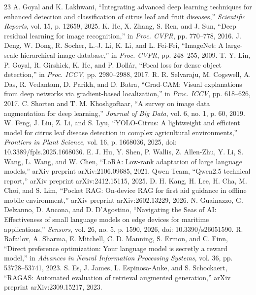 \documentclass[10pt,twocolumn,a4paper]{article}
\begin{document}
{\begin{thebibliography}{23}
 A. Goyal and K. Lakhwani, “Integrating advanced deep learning techniques for enhanced detection and classification of citrus leaf and fruit diseases,” \textit{Scientific Reports}, vol. 15, p. 12659, 2025.
 K. He, X. Zhang, S. Ren, and J. Sun, “Deep residual learning for image recognition,” in \textit{Proc. CVPR}, pp. 770–778, 2016.
 J. Deng, W. Dong, R. Socher, L.-J. Li, K. Li, and L. Fei-Fei, “ImageNet: A large-scale hierarchical image database,” in \textit{Proc. CVPR}, pp. 248–255, 2009.
 T.-Y. Lin, P. Goyal, R. Girshick, K. He, and P. Dollár, “Focal loss for dense object detection,” in \textit{Proc. ICCV}, pp. 2980–2988, 2017.
 R. R. Selvaraju, M. Cogswell, A. Das, R. Vedantam, D. Parikh, and D. Batra, “Grad-CAM: Visual explanations from deep networks via gradient-based localization,” in \textit{Proc. ICCV}, pp. 618–626, 2017.
 C. Shorten and T. M. Khoshgoftaar, “A survey on image data augmentation for deep learning,” \textit{Journal of Big Data}, vol. 6, no. 1, p. 60, 2019.
 W. Feng, J. Liu, Z. Li, and S. Lyu, “YOLO-Citrus: A lightweight and efficient model for citrus leaf disease detection in complex agricultural environments,” \textit{Frontiers in Plant Science}, vol. 16, p. 1668036, 2025, doi: 10.3389/fpls.2025.1668036.
 E. J. Hu, Y. Shen, P. Wallis, Z. Allen-Zhu, Y. Li, S. Wang, L. Wang, and W. Chen, “LoRA: Low-rank adaptation of large language models,” arXiv preprint arXiv:2106.09685, 2021.
 Qwen Team, “Qwen2.5 technical report,” arXiv preprint arXiv:2412.15115, 2025.
 D. H. Kang, H. Lee, H. Cha, M. Choi, and S. Lim, “Pocket RAG: On-device RAG for first aid guidance in offline mobile environment,” arXiv preprint arXiv:2602.13229, 2026.
 N. Guainazzo, G. Delzanno, D. Ancona, and D. D’Agostino, “Navigating the Seas of AI: Effectiveness of small language models on edge devices for maritime applications,” \textit{Sensors}, vol. 26, no. 5, p. 1590, 2026, doi: 10.3390/s26051590.
 R. Rafailov, A. Sharma, E. Mitchell, C. D. Manning, S. Ermon, and C. Finn, “Direct preference optimization: Your language model is secretly a reward model,” in \textit{Advances in Neural Information Processing Systems}, vol. 36, pp. 53728–53741, 2023.
 S. Es, J. James, L. Espinosa-Anke, and S. Schockaert, “RAGAS: Automated evaluation of retrieval augmented generation,” arXiv preprint arXiv:2309.15217, 2023.
\end{thebibliography}
}
\end{document}
